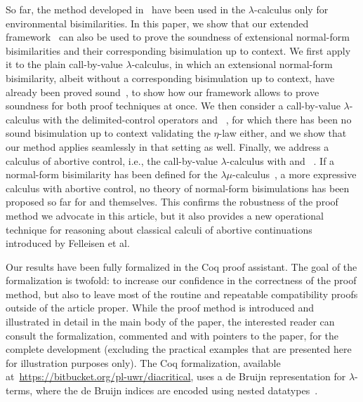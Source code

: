 \documentclass{lmcs}
\theoremstyle{defC}
\begin{document}
So far, the method developed in~\cite{Madiot-al:CONCUR14,Aristizabal-al:FSCD16}
have been used in the $\lambda$-calculus only for environmental
bisimilarities. In this paper, we show that our extended
framework~\cite{Aristizabal-al:FSCD16} can also be used to prove the soundness
of extensional normal-form bisimilarities and their corresponding bisimulation
up to context. We first apply it to the plain call-by-value $\lambda$-calculus,
in which an extensional normal-form bisimilarity, albeit without a corresponding
bisimulation up to context, have already been proved sound~\cite{Lassen:LICS05},
to show how our framework allows to prove soundness for both proof techniques at
once. We then consider a call-by-value $\lambda$-calculus with the
delimited-control operators \textshift{} and
\textreset~\cite{Danvy-Filinski:LFP90}, for which there has been no sound
bisimulation up to context validating the $\eta$-law either, and we show that
our method applies seamlessly in that setting as well. Finally, we address a
calculus of abortive control, i.e., the call-by-value $\lambda$-calculus with
\textcallcc and \textabort~\cite{Felleisen-Friedman:FDPC3,Felleisen-Hieb:TCS92}.
If a normal-form bisimilarity has been defined for the
$\lambda\mu$-calculus~\cite{Stoevring-Lassen:POPL07}, a more expressive calculus
with abortive control, no theory of normal-form bisimulations has been proposed
so far for \textcallcc and \textabort themselves. This confirms the robustness
of the proof method we advocate in this article, but it also provides a new
operational technique for reasoning about classical calculi of abortive
continuations introduced by Felleisen et al.

Our results have been fully formalized in the Coq proof assistant.
The goal of the formalization is twofold: to increase our confidence in the
correctness of the proof method, but also to leave most of the routine and
repeatable compatibility proofs outside of the article proper. While the proof
method is introduced and illustrated in detail in the main body of the paper,
the interested reader can consult the formalization, commented and with pointers
to the paper, for the complete development (excluding the practical examples
that are presented here for illustration purposes only). The Coq formalization,
available at~\url{https://bitbucket.org/pl-uwr/diacritical}, uses a de Bruijn
representation for $\lambda$-terms, where the de Bruijn indices are encoded
using nested datatypes~\cite{Bird-Paterson:JFP99}.
\end{document}
